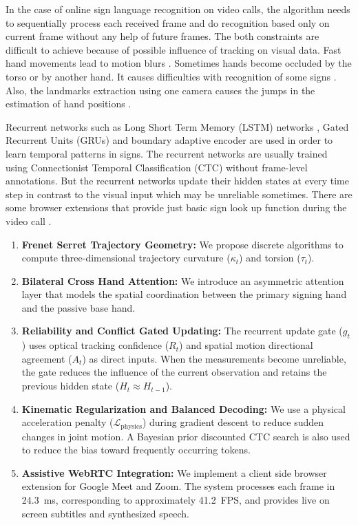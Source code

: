 \documentclass[conference]{IEEEtran}
\begin{document}
In the case of online sign language recognition on video calls, the algorithm needs to sequentially process each received frame and do recognition based only on current frame without any help of future frames. The both constraints are difficult to achieve because of possible influence of tracking on visual data. Fast hand movements lead to motion blurs \cite{b3}. Sometimes hands become occluded by the torso or by another hand. It causes difficulties with recognition of some signs \cite{b4,b5}. Also, the landmarks extraction using one camera causes the jumps in the estimation of hand positions \cite{b6}.

Recurrent networks such as Long Short Term Memory (LSTM) networks \cite{b2}, Gated Recurrent Units (GRUs) and boundary adaptive encoder \cite{b7} are used in order to learn temporal patterns in signs. The recurrent networks are usually trained using Connectionist Temporal Classification (CTC) \cite{b8} without frame-level annotations. But the recurrent networks update their hidden states at every time step in contrast to the visual input which may be unreliable sometimes. There are some browser extensions that provide just basic sign look up function during the video call \cite{b9}. 

\begin{enumerate}

    \item \textbf{Frenet Serret Trajectory Geometry:}
    We propose discrete algorithms to compute three-dimensional trajectory curvature ($\kappa_t$) and torsion ($\tau_t$).

    \item \textbf{Bilateral Cross Hand Attention:}
    We introduce an asymmetric attention layer that models the spatial coordination between the primary signing hand and the passive base hand.

    \item \textbf{Reliability and Conflict Gated Updating:}
    The recurrent update gate ($g_t$) uses optical tracking confidence ($R_t$) and spatial motion directional agreement ($A_t$) as direct inputs. When the measurements become unreliable, the gate reduces the influence of the current observation and retains the previous hidden state ($H_t \approx H_{t-1}$).

    \item \textbf{Kinematic Regularization and Balanced Decoding:}
    We use a physical acceleration penalty ($\mathcal{L}_{\text{physics}}$) during gradient descent to reduce sudden changes in joint motion. A Bayesian prior discounted CTC search is also used to reduce the bias toward frequently occurring tokens.

    \item \textbf{Assistive WebRTC Integration:}
    We implement a client side browser extension for Google Meet and Zoom. The system processes each frame in 24.3~ms, corresponding to approximately 41.2~FPS, and provides live on screen subtitles and synthesized speech.

\end{enumerate}
\end{document}
